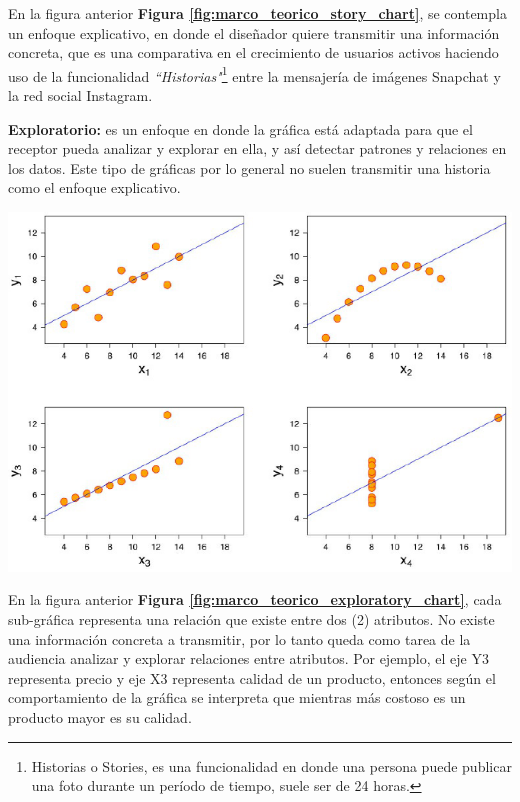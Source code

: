 En la figura anterior \textbf{Figura \ref{fig:marco_teorico_story_chart}}, se contempla un enfoque explicativo, en donde el diseñador quiere transmitir una información concreta, que es una comparativa en el crecimiento de usuarios activos haciendo uso de la funcionalidad \textit{“Historias"}\footnote{Historias o Stories, es una funcionalidad en donde una persona puede publicar una foto durante un período de tiempo, suele ser de 24 horas.} entre la mensajería de imágenes Snapchat y la red social Instagram.

\textbf{Exploratorio:} es un enfoque en donde la gráfica está adaptada para que el receptor pueda analizar y explorar en ella, y así detectar patrones y relaciones en los datos. Este tipo de gráficas por lo general no suelen transmitir una historia como el enfoque explicativo.

\begin{center}
    \bigbreak
    \includegraphics[scale=0.45]{images/marco_teorico/exploratory_chart.png}
    \label{fig:marco_teorico_exploratory_chart}
    \bigbreak
\end{center}

En la figura anterior \textbf{Figura \ref{fig:marco_teorico_exploratory_chart}}, cada sub-gráfica representa una relación que existe entre dos (2) atributos. No existe una información concreta a transmitir, por lo tanto queda como tarea de la audiencia analizar y explorar relaciones entre atributos. Por ejemplo, el eje Y3 representa precio y eje X3 representa calidad de un producto, entonces según el comportamiento de la gráfica se interpreta que mientras más costoso es un producto mayor es su calidad.

